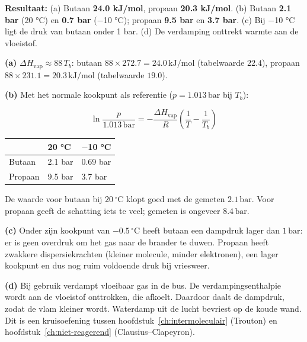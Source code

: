 \begin{oplossing}
\textbf{Resultaat:} (a) Butaan \textbf{24.0 kJ/mol}, propaan \textbf{20.3 kJ/mol}. (b) Butaan \textbf{2.1 bar} (20 °C) en \textbf{0.7 bar} (\ensuremath{-}10 °C); propaan \textbf{9.5 bar} en \textbf{3.7 bar}. (c) Bij \ensuremath{-}10 °C ligt de druk van butaan onder 1 bar. (d) De verdamping onttrekt warmte aan de vloeistof.

\textbf{(a)} \(\Delta H_{\text{vap}} \approx 88\,T_b\): butaan \(88 \times 272.7 = 24.0\,\mathrm{kJ/mol}\) (tabelwaarde \(22.4\)), propaan \(88 \times 231.1 = 20.3\,\mathrm{kJ/mol}\) (tabelwaarde \(19.0\)).

\textbf{(b)} Met het normale kookpunt als referentie (\(p = 1.013\,\mathrm{bar}\) bij \(T_b\)):

\[
\ln\frac{p}{1.013\,\mathrm{bar}} = -\frac{\Delta H_{\text{vap}}}{R}\left(\frac{1}{T}-\frac{1}{T_b}\right)
\]

\begin{center}
\begin{tabular}{lll}
\toprule
 & 20 °C & \ensuremath{-}10 °C \\
\midrule
Butaan & 2.1 bar & 0.69 bar \\
Propaan & 9.5 bar & 3.7 bar \\
\bottomrule
\end{tabular}
\end{center}

De waarde voor butaan bij \(20\,^\circ\mathrm{C}\) klopt goed met de gemeten \(2.1\,\mathrm{bar}\). Voor propaan geeft de schatting iets te veel; gemeten is ongeveer \(8.4\,\mathrm{bar}\).

\textbf{(c)} Onder zijn kookpunt van \(-0.5\,^\circ\mathrm{C}\) heeft butaan een dampdruk lager dan \(1\,\mathrm{bar}\): er is geen overdruk om het gas naar de brander te duwen. Propaan heeft zwakkere dispersiekrachten (kleiner molecule, minder elektronen), een lager kookpunt en dus nog ruim voldoende druk bij vriesweer.

\textbf{(d)} Bij gebruik verdampt vloeibaar gas in de bus. De verdampingsenthalpie wordt aan de vloeistof onttrokken, die afkoelt. Daardoor daalt de dampdruk, zodat de vlam kleiner wordt. Waterdamp uit de lucht bevriest op de koude wand. Dit is een kruisoefening tussen hoofdstuk~\ref{ch:intermoleculair} (Trouton) en hoofdstuk~\ref{ch:niet-reagerend} (Clausius--Clapeyron).
\end{oplossing}

